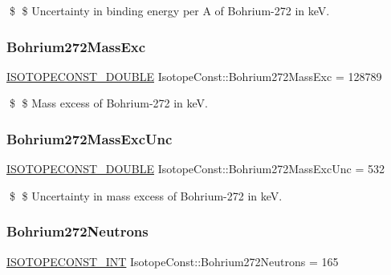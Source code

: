 \$ \$ Uncertainty in binding energy per A of Bohrium-\/272 in keV. \mbox{\label{group___isotope_const-_bohrium-_bh272_gadfa0dafc8583e8bd5ccfa2c739b67d49}} 
\subsubsection{\texorpdfstring{Bohrium272\+Mass\+Exc}{Bohrium272MassExc}}
{\footnotesize\ttfamily \mbox{\hyperlink{group___isotope_const-_macros_ga8f45a7272ce02c0b4c65c44636ed719a}{I\+S\+O\+T\+O\+P\+E\+C\+O\+N\+S\+T\+\_\+\+D\+O\+U\+B\+LE}} Isotope\+Const\+::\+Bohrium272\+Mass\+Exc = 128789}

\$ \$ Mass excess of Bohrium-\/272 in keV. \mbox{\label{group___isotope_const-_bohrium-_bh272_gad337058d3f3a58232100b2403d613a91}} 
\subsubsection{\texorpdfstring{Bohrium272\+Mass\+Exc\+Unc}{Bohrium272MassExcUnc}}
{\footnotesize\ttfamily \mbox{\hyperlink{group___isotope_const-_macros_ga8f45a7272ce02c0b4c65c44636ed719a}{I\+S\+O\+T\+O\+P\+E\+C\+O\+N\+S\+T\+\_\+\+D\+O\+U\+B\+LE}} Isotope\+Const\+::\+Bohrium272\+Mass\+Exc\+Unc = 532}

\$ \$ Uncertainty in mass excess of Bohrium-\/272 in keV. \mbox{\label{group___isotope_const-_bohrium-_bh272_gabd874e2ed92eee3d3a3b001c5f63fa61}} 
\subsubsection{\texorpdfstring{Bohrium272\+Neutrons}{Bohrium272Neutrons}}
{\footnotesize\ttfamily \mbox{\hyperlink{group___isotope_const-_macros_ga5f18360b3e99483a35c32d789e62621c}{I\+S\+O\+T\+O\+P\+E\+C\+O\+N\+S\+T\+\_\+\+I\+NT}} Isotope\+Const\+::\+Bohrium272\+Neutrons = 165}

